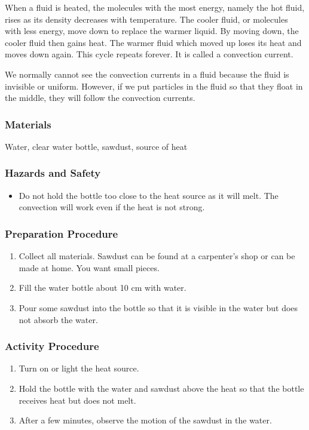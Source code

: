 When a fluid is heated, the molecules with the most energy, namely the hot fluid, rises as its density decreases with temperature.  The cooler fluid, or molecules with less energy, move down to replace the warmer liquid.  By moving down, the cooler fluid then gains heat.  The warmer fluid which moved up loses its heat and moves down again.  This cycle repeats forever.  It is called a convection current.

We normally cannot see the convection currents in a fluid because the fluid is invisible or uniform.  However, if we put particles in the fluid so that they float in the middle, they will follow the convection currents.

\subsubsection*{Materials}
Water, clear water bottle, sawdust, source of heat

\subsubsection*{Hazards and Safety}
\begin{itemize}
\item{Do not hold the bottle too close to the heat source as it will melt.  The convection will work even if the heat is not strong.}
\end{itemize}

\subsubsection*{Preparation Procedure}
\begin{enumerate}
\item{Collect all materials.  Sawdust can be found at a carpenter's shop or can be made at home.  You want small pieces.}
\item{Fill the water bottle about 10 cm with water.}
\item{Pour some sawdust into the bottle so that it is visible in the water but does not absorb the water.}
\end{enumerate}

\subsubsection*{Activity Procedure}
\begin{enumerate}
\item{Turn on or light the heat source.}
\item{Hold the bottle with the water and sawdust above the heat so that the bottle receives heat but does not melt.}
\item{After a few minutes, observe the motion of the sawdust in the water.}
\end{enumerate}

